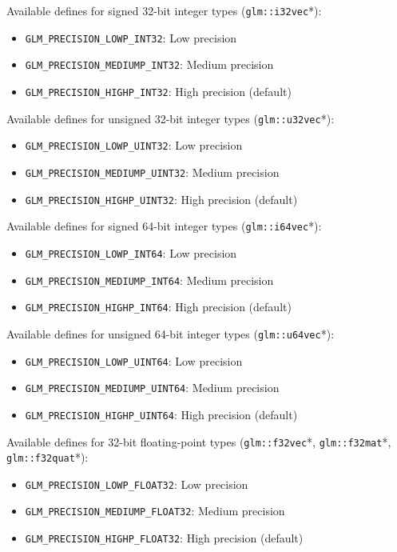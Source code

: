 \documentclass{scrartcl}
\numberwithin{figure}{subsection}
\begin{document}
Available defines for signed 32-bit integer types (\verb|glm::i32vec|*):

\begin{itemize}
    \item \verb|GLM_PRECISION_LOWP_INT32|: Low precision
    \item \verb|GLM_PRECISION_MEDIUMP_INT32|: Medium precision
    \item \verb|GLM_PRECISION_HIGHP_INT32|: High precision (default)
\end{itemize}

Available defines for unsigned 32-bit integer types (\verb|glm::u32vec|*):

\begin{itemize}
    \item \verb|GLM_PRECISION_LOWP_UINT32|: Low precision
    \item \verb|GLM_PRECISION_MEDIUMP_UINT32|: Medium precision
    \item \verb|GLM_PRECISION_HIGHP_UINT32|: High precision (default)
\end{itemize}

Available defines for signed 64-bit integer types (\verb|glm::i64vec|*):

\begin{itemize}
    \item \verb|GLM_PRECISION_LOWP_INT64|: Low precision
    \item \verb|GLM_PRECISION_MEDIUMP_INT64|: Medium precision
    \item \verb|GLM_PRECISION_HIGHP_INT64|: High precision (default)
\end{itemize}

Available defines for unsigned 64-bit integer types (\verb|glm::u64vec|*):

\begin{itemize}
    \item \verb|GLM_PRECISION_LOWP_UINT64|: Low precision
    \item \verb|GLM_PRECISION_MEDIUMP_UINT64|: Medium precision
    \item \verb|GLM_PRECISION_HIGHP_UINT64|: High precision (default)
\end{itemize}

Available defines for 32-bit floating-point types (\verb|glm::f32vec|*, \verb|glm::f32mat|*, \verb|glm::f32quat|*):

\begin{itemize}
    \item \verb|GLM_PRECISION_LOWP_FLOAT32|: Low precision
    \item \verb|GLM_PRECISION_MEDIUMP_FLOAT32|: Medium precision
    \item \verb|GLM_PRECISION_HIGHP_FLOAT32|: High precision (default)
\end{itemize}
\end{document}
